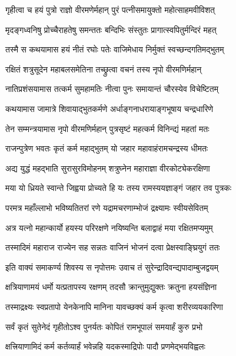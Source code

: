 \twolineshloka
{गृहीत्वा च हयं पुत्रो राज्ञो वीरमणेर्महान्}
{पुरं पत्नीसमायुक्तो महोत्साहमवीविशत्}%

\twolineshloka
{मृदङ्गध्वनिषु प्रोच्चैराहतेषु समन्ततः}
{बन्दिभिः संस्तुतः प्रागात्स्वपितुर्मन्दिरं महत्}%

\twolineshloka
{तस्मै स कथयामास हयं नीतं रघोः पतेः}
{वाजिमेधाय निर्मुक्तं स्वच्छन्दगतिमद्भुतम्}%

\twolineshloka
{रक्षितं शत्रुसूदेन महाबलसमेतिना}
{तच्छ्रुत्वा वचनं तस्य नृपो वीरमणिर्महान्}%

\twolineshloka
{नातिप्रशंसयामास तत्कर्म सुमहामतिः}
{नीत्वा पुनः समायान्तं चौरस्येव विचेष्टितम्}%

\twolineshloka
{कथयामास जामात्रे शिवायाद्भुतकर्मणे}
{अर्धाङ्गनाधरायाङ्गभूषाय चन्द्रधारिणे}%

\twolineshloka
{तेन सम्मन्त्रयामास नृपो वीरमणिर्महान्}
{पुत्रसृष्टं महत्कर्म विनिन्द्यं महतां मतः}%


\twolineshloka
{राजन्पुत्रेण भवतः कृतं कर्म महाद्भुतम्}
{यो जहार महावाहंरामचन्द्रस्य धीमतः}%

\twolineshloka
{अद्य युद्धं महद्भाति सुरासुरविमोहनम्}
{शत्रुघ्नेन महाराज्ञा वीरकोट्येकरक्षिणा}%

\twolineshloka
{मया यो ध्रियते स्वान्ते जिह्वया प्रोच्यते हि यः}
{तस्य रामस्ययज्ञाङ्गं जहार तव पुत्रकः}%

\twolineshloka
{परमत्र महाँल्लाभो भविष्यतितरां रणे}
{यद्रामचरणाम्भोजं द्रक्ष्यामः स्वीयसेवितम्}%

\twolineshloka
{अत्र यत्नो महान्कार्यो हयस्य परिरक्षणे}
{नयिष्यन्ति बलाद्वाहं मया रक्षितमप्यमुम्}%

\twolineshloka
{तस्मादिमं महाराज राज्येन सह सन्नतः}
{वाजिनं भोजनं दत्वा प्रेक्षस्वाङ्घ्रियुगं ततः}%

\twolineshloka
{इति वाक्यं समाकर्ण्य शिवस्य स नृपोत्तमः}
{उवाच तं सुरेन्द्रादिवन्द्यपादाम्बुजद्वयम्}%


\twolineshloka
{क्षत्रियाणामयं धर्मो यत्प्रतापस्य रक्षणम्}
{तदसौ क्रान्तुमुद्युक्तः क्रतुना हयसंज्ञिना}%

\twolineshloka
{तस्माद्रक्ष्यः स्वप्रतापो येनकेनापि मानिना}
{यावच्छक्यं कर्म कृत्वा शरीरव्ययकारिणा}%

\twolineshloka
{सर्वं कृतं सुतेनेदं गृहीतोऽश्व पुनर्यतः}
{कोपितं रामभूपालं समयार्हं कुरु प्रभो}%

\twolineshloka
{क्षत्त्रियाणामिदं कर्म कर्तव्यार्हं भवेन्नहि}
{यदकस्माद्रिपोः पादौ प्रणमेद्भयविह्वलः}%

